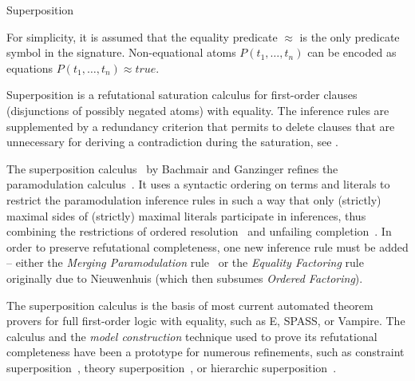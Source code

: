 \begin{entry}{Superposition}
\begin{calculus}
For simplicity, it is assumed that the equality predicate $\approx$
is the only predicate symbol in the signature.
Non-equational atoms $P(t_1,\dots,t_n)$ can be encoded as
equations $P(t_1,\dots,t_n) \approx \mathit{true}$.

% 
\end{calculus}



\begin{clarifications}
Superposition is a refutational saturation calculus for
first-order clauses (disjunctions of possibly negated atoms)
with equality.
The inference rules are supplemented by a redundancy criterion
that permits to delete clauses that are unnecessary for
deriving a contradiction during the saturation, see .
\end{clarifications}

\begin{history}
The superposition
calculus~\cite{BachmairGanzinger1990CTRS,BachmairGanzinger1994JLC}
by Bachmair and Ganzinger
refines the paramodulation calculus~.
It uses a syntactic ordering on terms and
literals to restrict the paramodulation inference rules
in such a way that only (strictly) maximal sides of (strictly) maximal
literals participate in inferences,
thus combining the restrictions of
ordered resolution~ and
unfailing completion~.
In order to preserve refutational completeness, one new
inference rule must be added -- either
the \textit{Merging Paramodulation} rule~\cite{BachmairGanzinger1990CTRS}
or the \textit{Equality Factoring} rule originally due to Nieuwenhuis
(which then subsumes \textit{Ordered Factoring}).

The superposition calculus is the basis of most current automated
theorem provers for full first-order logic with equality,
such as E, SPASS, or Vampire.
The calculus and the \emph{model construction} technique used
to prove its refutational completeness have been a prototype
for numerous refinements, such as
constraint superposition~,
theory superposition~,
or hierarchic superposition~.

\end{history}


\end{entry}
